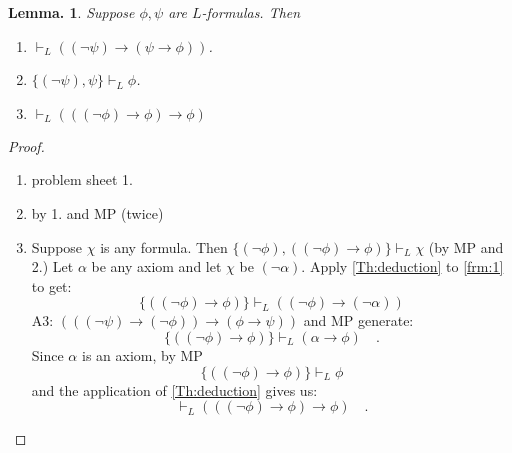 \documentclass[a4paper,oneside,11pt,DIV=12,parskip=half]{scrartcl}
\theoremstyle{plain}
\newtheorem{lemma}[theorem]{Lemma.}
\theoremstyle{definition}
\newtheorem{remark, definition}[theorem]{Remark and Definition.}
\newtheorem{lemma, definition}[theorem]{Lemma and Definition.}
\newtheorem{theorem, definition}[theorem]{Theorem and Definition.}
\theoremstyle{remark}
\newtheorem*{remark, example}{\textbf{Remark and Exercise}}
\begin{document}
\begin{lemma}
Suppose $\phi,\psi$ are $L$-formulas. Then
\begin{enumerate}
    \item $\vdash_L ((\lnot \psi) \rightarrow (\psi \rightarrow \phi))$.
    \item $\{(\lnot \psi),\psi\} \vdash_L \phi$.
    \item $\vdash_L (((\lnot \phi) \rightarrow \phi) \rightarrow \phi)$
\end{enumerate}
\end{lemma}

\begin{proof}
\begin{enumerate}
    \item problem sheet 1.
    \item by 1. and MP (twice)
    \item Suppose $\chi$ is any formula. Then $\{(\lnot \phi),((\lnot \phi) \rightarrow \phi) \} \vdash_L \chi$\label{frm:1} (by MP and 2.) 
    Let $\alpha$ be any axiom and let $\chi$ be $(\lnot \alpha)$.
    Apply \ref{Th:deduction} to \ref{frm:1} to get:
    \[ \{((\lnot \phi) \rightarrow \phi)\} \vdash_L ((\lnot \phi) \rightarrow (\lnot \alpha)) \]
    A3: $(((\lnot \psi) \rightarrow ( \lnot \phi)) \rightarrow (\phi \rightarrow \psi))$ and MP generate:
    \[ \{((\lnot \phi) \rightarrow \phi)\} \vdash_L ( \alpha \rightarrow \phi) \quad. \]
    Since $\alpha$ is an axiom, by MP
        \[ \{((\lnot \phi) \rightarrow \phi)\} \vdash_L \phi \] and the application of \ref{Th:deduction} gives us:
        \[ \vdash_L (((\lnot \phi) \rightarrow \phi) \rightarrow \phi) \quad. \]
\end{enumerate}

\end{proof}
\end{document}

